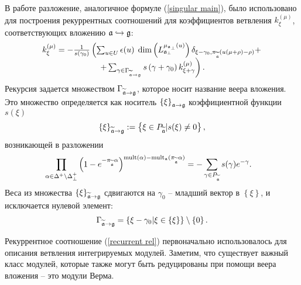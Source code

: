 \begin{remark}

В работе \cite{2010arXiv1007.0318L} разложение, аналогичное формуле (\ref{singular main}), было использовано для построения рекуррентных соотношений для коэффициентов ветвления $k_{\xi}^{\left( \mu \right) }$, соответствующих вложению  $\frak{a}\hookrightarrow \frak{g}$:
\begin{equation}
\begin{array}{c}
k_{\xi }^{\left( \mu \right) }=-\frac{1}{s\left( \gamma _{0}\right) }\left(
\sum_{u\in U}\epsilon (u)\;\dim \left( L_{\frak{a}_{\perp }}^{\mu _{\frak{a}%
_{\perp }}\left( u\right) }\right) \delta _{\xi -\gamma _{0},\pi _{%
\widetilde{\frak{a}}}(u(\mu +\rho )-\rho )}+\right.  \\
\left. +\sum_{\gamma \in \Gamma _{\widetilde{\frak{a}}\rightarrow \frak{g}%
}}s\left( \gamma +\gamma _{0}\right) k_{\xi +\gamma }^{\left( \mu \right)
}\right) .
\end{array}
\label{recurrent rel}
\end{equation}
Рекурсия задается множеством  $\Gamma _{\widetilde{\frak{a}}\rightarrow \frak{g}}$, которое носит название веера вложения. Это множество определяется как носитель  $\left\{ \xi \right\}_{\frak{a}\rightarrow \frak{g}}$  коэффициентной функции $s(\xi )$
\begin{equation*}
\left\{ \xi \right\} _{\widetilde{\frak{a}}\rightarrow \frak{g}}:=\left\{
\xi \in P_{\widetilde{\frak{a}}}|s(\xi )\neq 0\right\},
\end{equation*}
возникающей в разложении 
\begin{equation}
\prod_{\alpha \in \Delta ^{+}\setminus \Delta _{\bot }^{+}}\left( 1-e^{-\pi
_{\widetilde{\frak{a}}}\alpha }\right) ^{\mathrm{mult}(\alpha )-\mathrm{mult}%
_{\frak{a}}(\pi _{\widetilde{\frak{a}}}\alpha )}=-\sum_{\gamma \in P_{%
\widetilde{\frak{a}}}}s(\gamma )e^{-\gamma }.\quad
\end{equation}
Веса из множества $\left\{ \xi \right\} _{\widetilde{\frak{a}}\rightarrow \frak{%
g}}$ сдвигаются на $\gamma _{0}$ -- младший вектор в $\left\{ \xi
\right\} $, и исключается нулевой элемент:
\begin{equation}
\Gamma _{\widetilde{\frak{a}}\rightarrow \frak{g}}=\left\{ \xi -\gamma
_{0}|\xi \in \left\{ \xi \right\} \right\} \setminus \left\{ 0\right\} .
\end{equation}

Рекуррентное соотношение (\ref{recurrent rel}) первоначально использовалось для описания ветвления интегрируемых модулей. Заметим, что существует важный класс модулей, которые также могут быть редуцированы при помощи веера вложения -- это модули Верма.
\end{remark}

